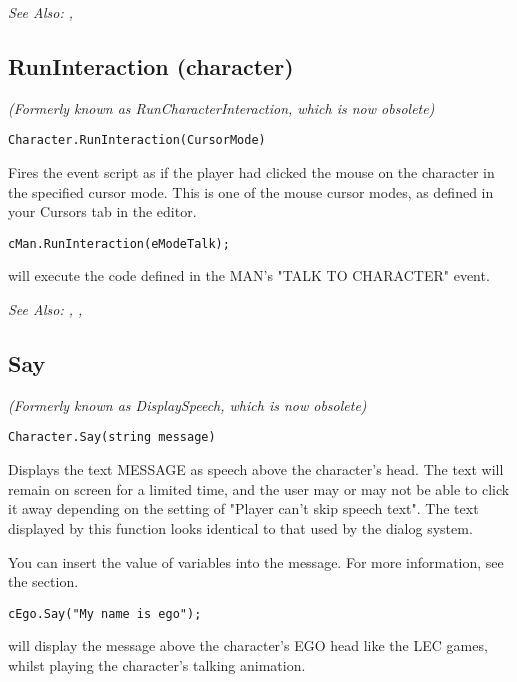 \it{See Also:} ,


\subsection{RunInteraction (character)}\label{Character.RunInteraction}%

\it{(Formerly known as RunCharacterInteraction, which is now obsolete)}

\begin{verbatim}
Character.RunInteraction(CursorMode)
\end{verbatim}
Fires the event script as if the player had clicked the mouse on the character
in the specified cursor mode. This is one of the mouse cursor
modes, as defined in your Cursors tab in the editor.

\begin{verbatim}
cMan.RunInteraction(eModeTalk);
\end{verbatim}
will execute the code defined in the MAN's "TALK TO CHARACTER" event.

\it{See Also:} , ,


\subsection{Say}\label{Character.Say}%

\it{(Formerly known as DisplaySpeech, which is now obsolete)}

\begin{verbatim}
Character.Say(string message)
\end{verbatim}
Displays the text MESSAGE as speech above the character's head.
The text will remain on screen for a limited time, and the user may or may
not be able to click it away depending on the setting of "Player can't
skip speech text". The text displayed by this function looks identical to
that used by the dialog system.

You can insert the value of variables into the message. For more information,
see the  section.

\begin{verbatim}
cEgo.Say("My name is ego");
\end{verbatim}
will display the message above the character's EGO head like the LEC games,
whilst playing the character's talking animation.

